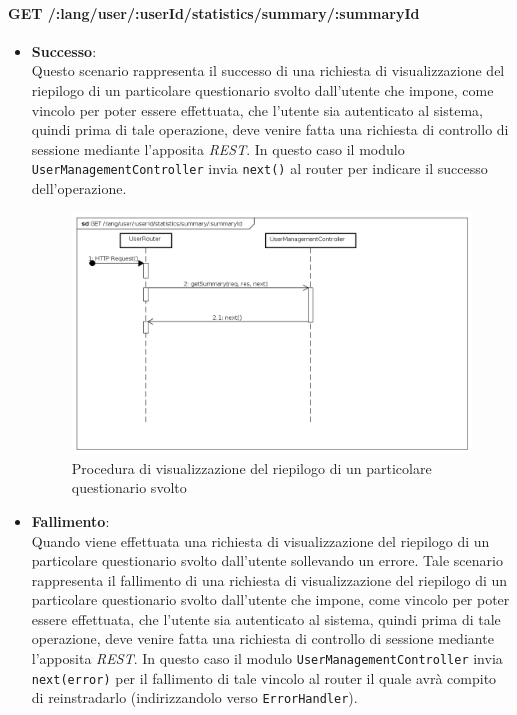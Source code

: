 \paragraph{GET /:lang/user/:userId/statistics/summary/:summaryId}
\begin{itemize}
\item \textbf{Successo}:
\\
Questo scenario rappresenta il successo di una richiesta di visualizzazione del riepilogo di un particolare questionario svolto dall'utente che impone, come vincolo per poter essere effettuata, che l'utente sia autenticato al sistema, quindi prima di tale operazione, deve venire fatta una richiesta di controllo di sessione mediante l'apposita \textit{REST}.  
In questo caso il modulo \texttt{UserManagementController} invia \texttt{next()} al router per indicare il successo dell'operazione.
\label{Procedura di visualizzazione del riepilogo di un particolare questionario svolto}
\begin{figure}[ht]
	\centering
	\includegraphics[scale=0.40]{UML/DiagrammiDiSequenza/Back-end/GET_LangUserUserIdStatisticsSummarySummaryIdSuccess.png}
	\caption{Procedura di visualizzazione del riepilogo di un particolare questionario svolto}
\end{figure}
\FloatBarrier
\item \textbf{Fallimento}:
\\
Quando viene effettuata una richiesta di visualizzazione del riepilogo di un particolare questionario svolto dall'utente sollevando un errore. Tale scenario rappresenta il fallimento di una richiesta di visualizzazione del riepilogo di un particolare questionario svolto dall'utente che impone, come vincolo per poter essere effettuata, che l'utente sia autenticato al sistema, quindi prima di tale operazione, deve venire fatta una richiesta di controllo di sessione mediante l'apposita \textit{REST}. In questo caso il modulo \texttt{UserManagementController} invia \texttt{next(error)} per il fallimento di tale vincolo al router il quale avrà compito di reinstradarlo (indirizzandolo verso \texttt{ErrorHandler}).

\end{itemize}
